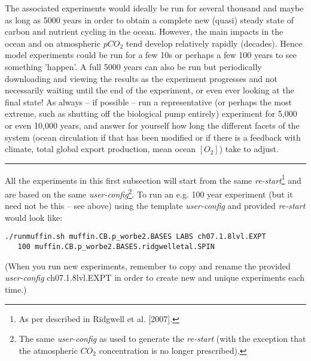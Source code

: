 \newpage
%
The associated experiments would ideally be run for several thousand and maybe as long as 5000 years in order to obtain a complete new (quasi) steady state of carbon and nutrient cycling in the ocean. However, the main impacts in the ocean and on atmospheric \(pCO_{2}\) tend develop relatively rapidly (decades). Hence model experiments could be run for a few 10s or perhaps a few 100 years to see something 'happen'.  A full 5000 years can also be run but periodically downloading and viewing the results as the experiment progresses and not necessarily waiting until the end of the experiment, or even ever looking at the final state! As always -- if possible -- run a representative (or perhaps the most extreme, such as shutting off the biological pump entirely) experiment for 5,000 or even 10,000 years, and answer for yourself how long the different facets of the system (ocean circulation if that has been modified or if there is a feedback with climate, total global export production, mean ocean \([O_{2}]\)) take to adjust.

\vspace{1mm}
\noindent\rule{4cm}{0.5pt}
\vspace{2mm}

\noindent All the experiments in this first subsection will start from the same \textit{re-start}\footnote{As per described in Ridgwell et al. [2007].} and are based on the same \textit{user-config}\footnote{The same \textit{user-config} as used to generate the \textit{re-start} (with the exception that the atmospheric \(CO_{2}\) concentration is no longer prescribed).}. To run an e.g. 100 year experiment (but it need not be this -- see above) using the template \textit{user-config} and provided \textit{re-start} would look like:
\vspace{-1mm}\small\begin{verbatim}
./runmuffin.sh muffin.CB.p_worbe2.BASES LABS ch07.1.8lvl.EXPT 
   100 muffin.CB.p_worbe2.BASES.ridgwelletal.SPIN
\end{verbatim}\normalsize\vspace{-1mm}
(When you run new experiments, remember to copy and rename the provided \textit{user-config} \textsf{\footnotesize ch07.1.8lvl.EXPT} in order to create new and unique experiments each time.)

\vspace{1mm}

